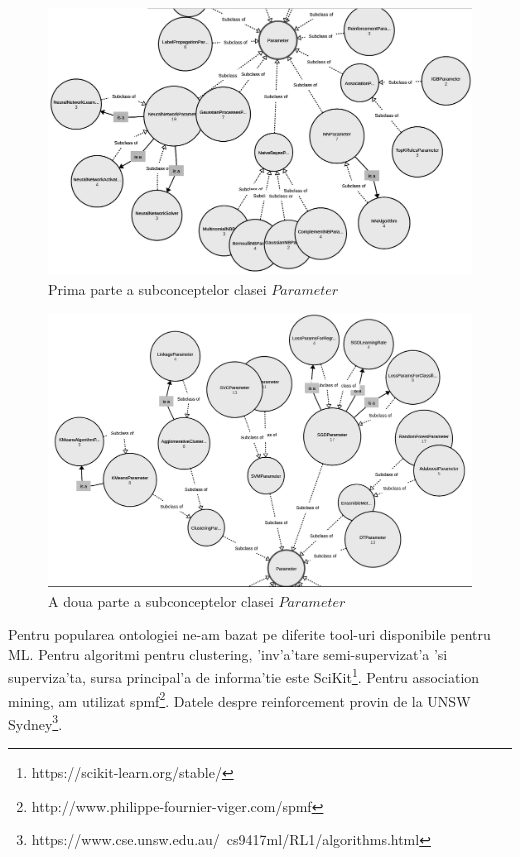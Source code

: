 \documentclass[12pt,a4paper,twoside]{report}
\begin{document}
\begin{figure}
    \centering
    \includegraphics[width = 0.95 \linewidth]{img/properties_subcls_1.png}
        \caption{Prima parte a subconceptelor clasei $Parameter$}
    \label{fig:subc_1}
\end{figure}

\begin{figure}
    \centering
    \includegraphics[width = 0.95 \linewidth]{img/properties_subcls_2.png}
        \caption{A doua parte a subconceptelor clasei $Parameter$}
    \label{fig:subc_2}
\end{figure}

Pentru popularea ontologiei ne-am bazat pe diferite tool-uri disponibile pentru ML. Pentru algoritmi pentru clustering, 'inv'a'tare semi-supervizat'a 'si superviza'ta, sursa principal'a de informa'tie este SciKit\footnote{https://scikit-learn.org/stable/}. Pentru association mining, am utilizat spmf\footnote{http://www.philippe-fournier-viger.com/spmf}. Datele despre reinforcement provin de la UNSW Sydney\footnote{https://www.cse.unsw.edu.au/~cs9417ml/RL1/algorithms.html}. 
\end{document}
